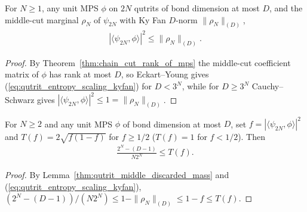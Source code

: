 \begin{lemma}
    \label{thm:qutrit_entropy_scaling_copy_overlap}
    \leanok
    For $N\ge1$, any unit MPS $\phi$ on $2N$ qutrits of bond dimension at most
    $D$, and the middle-cut marginal $\rho_N$ of $\psi_{2N}$ with Ky Fan
    $D$-norm $\|\rho_N\|_{(D)}$,
    \begin{align}
        |\langle\psi_{2N},\phi\rangle|^2\le\|\rho_N\|_{(D)}.
        \label{eq:qutrit_entropy_scaling_kyfan}
    \end{align}
\end{lemma}
\begin{proof}\leanok
    By Theorem~\ref{thm:chain_cut_rank_of_mps} the middle-cut coefficient
    matrix of $\phi$ has rank at most $D$, so Eckart--Young gives
    (\ref{eq:qutrit_entropy_scaling_kyfan}) for $D<3^N$, while for $D\ge3^N$
    Cauchy--Schwarz gives $|\langle\psi_{2N},\phi\rangle|^2\le1=\|\rho_N\|_{(D)}$.
\end{proof}

\begin{lemma}
    \label{thm:qutrit_entropy_scaling_copy_scalar_error}
    \leanok
    For $N\ge2$ and any unit MPS $\phi$ of bond dimension at most $D$, set
    $f=|\langle\psi_{2N},\phi\rangle|^2$ and $T(f)=2\sqrt{f(1-f)}$ for
    $f\ge1/2$ ($T(f)=1$ for $f<1/2$). Then
    \begin{align}
        \label{eq:qutrit_entropy_scaling_scalar_tail}
        \frac{2^N-(D-1)}{N2^N}\le T(f).
    \end{align}
\end{lemma}
\begin{proof}\leanok
    By Lemma~\ref{thm:qutrit_middle_discarded_mass} and
    (\ref{eq:qutrit_entropy_scaling_kyfan}),
    $(2^N-(D-1))/(N2^N)\le1-\|\rho_N\|_{(D)}\le1-f\le T(f)$.
\end{proof}

